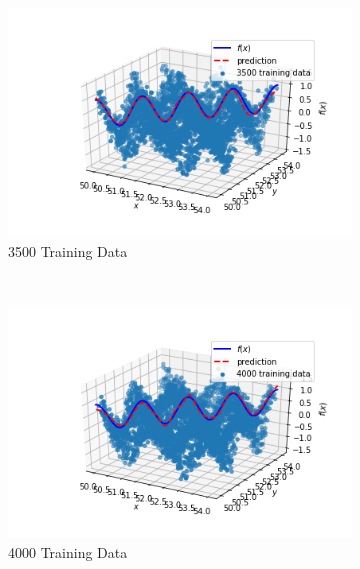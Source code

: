 \documentclass{article}
\begin{document}
\begin{figure}[htbp]
    \begin{subfigure}{0.45\textwidth}
        \includegraphics[width=\textwidth]{figures/3500TrainingData}
        \caption{3500 Training Data}
    \end{subfigure}
        ~ %
    \begin{subfigure}{0.45\textwidth}
        \includegraphics[width=\textwidth]{figures/4000TrainingData}
        \caption{4000 Training Data}
    \end{subfigure}
~ %
    \begin{subfigure}{0.45\textwidth}

\end{subfigure}
\end{figure}
\end{document}

